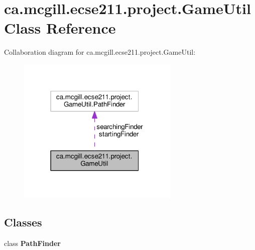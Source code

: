 \hypertarget{classca_1_1mcgill_1_1ecse211_1_1project_1_1_game_util}{}\section{ca.\+mcgill.\+ecse211.\+project.\+Game\+Util Class Reference}
\label{classca_1_1mcgill_1_1ecse211_1_1project_1_1_game_util}


Collaboration diagram for ca.\+mcgill.\+ecse211.\+project.\+Game\+Util\+:\nopagebreak
\begin{figure}[H]
\begin{center}
\leavevmode
\includegraphics[width=219pt]{classca_1_1mcgill_1_1ecse211_1_1project_1_1_game_util__coll__graph}
\end{center}
\end{figure}
\subsection*{Classes}
\begin{DoxyCompactItemize}
\item 
class {\bfseries Path\+Finder}
\end{DoxyCompactItemize}

